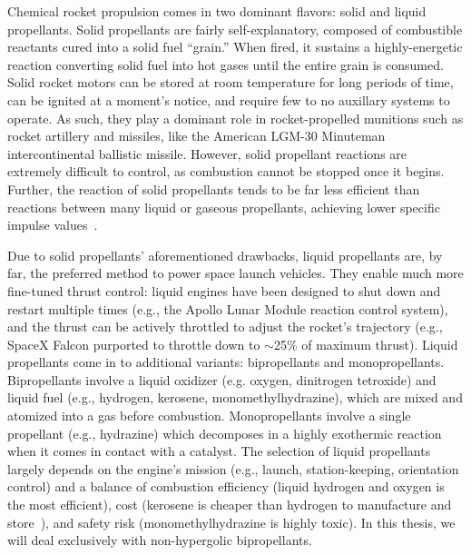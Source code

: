 Chemical rocket propulsion comes in two dominant flavors: solid and liquid propellants. Solid propellants are fairly self-explanatory, composed of combustible reactants cured into a solid fuel ``grain.'' When fired, it sustains a highly-energetic reaction converting solid fuel into hot gases until the entire grain is consumed. Solid rocket motors can be stored at room temperature for long periods of time, can be ignited at a moment's notice, and require few to no auxillary systems to operate. As such, they play a dominant role in rocket-propelled munitions such as rocket artillery and missiles, like the American LGM-30 Minuteman intercontinental ballistic missile. However, solid propellant reactions are extremely difficult to control, as combustion cannot be stopped once it begins. Further, the reaction of solid propellants tends to be far less efficient than reactions between many liquid or gaseous propellants, achieving lower specific impulse values~\cite{Sutton2003}.

Due to solid propellants' aforementioned drawbacks, liquid propellants are, by far, the preferred method to power space launch vehicles. They enable much more fine-tuned thrust control: liquid engines have been designed to shut down and restart multiple times (e.g., the Apollo Lunar Module reaction control system), and the thrust can be actively throttled to adjust the rocket's trajectory (e.g., SpaceX Falcon purported to throttle down to $\sim$25\% of maximum thrust). Liquid propellants come in to additional variants: bipropellants and monopropellants. Bipropellants involve a liquid oxidizer (e.g. oxygen, dinitrogen tetroxide) and liquid fuel (e.g., hydrogen, kerosene, monomethylhydrazine), which are mixed and atomized into a gas before combustion. Monopropellants involve a single propellant (e.g., hydrazine) which decomposes in a highly exothermic reaction when it comes in contact with a catalyst. The selection of liquid propellants largely depends on the engine's mission (e.g., launch, station-keeping, orientation control) and a balance of combustion efficiency (liquid hydrogen and oxygen is the most efficient), cost (kerosene is cheaper than hydrogen to manufacture and store~\cite{propellantCosts}), and safety risk (monomethylhydrazine is highly toxic). In this thesis, we will deal exclusively with non-hypergolic bipropellants.

